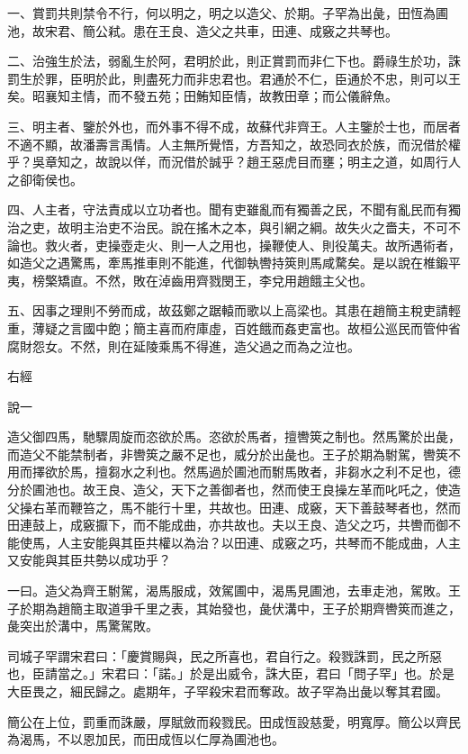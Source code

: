 
\begin{pinyinscope}
一、賞罰共則禁令不行，何以明之，明之以造父、於期。子罕為出彘，田恆為圃池，故宋君、簡公弒。患在王良、造父之共車，田連、成竅之共琴也。

二、治強生於法，弱亂生於阿，君明於此，則正賞罰而非仁下也。爵祿生於功，誅罰生於罪，臣明於此，則盡死力而非忠君也。君通於不仁，臣通於不忠，則可以王矣。昭襄知主情，而不發五苑；田鮪知臣情，故教田章；而公儀辭魚。

三、明主者、鑒於外也，而外事不得不成，故蘇代非齊王。人主鑒於士也，而居者不適不顯，故潘壽言禹情。人主無所覺悟，方吾知之，故恐同衣於族，而況借於權乎？吳章知之，故說以佯，而況借於誠乎？趙王惡虎目而壅；明主之道，如周行人之卻衛侯也。

四、人主者，守法責成以立功者也。聞有吏雖亂而有獨善之民，不聞有亂民而有獨治之吏，故明主治吏不治民。說在搖木之本，與引網之綱。故失火之嗇夫，不可不論也。救火者，吏操壺走火、則一人之用也，操鞭使人、則役萬夫。故所遇術者，如造父之遇驚馬，牽馬推車則不能進，代御執轡持筴則馬咸騖矣。是以說在椎鍛平夷，榜檠矯直。不然，敗在淖齒用齊戮閔王，李兌用趙餓主父也。

五、因事之理則不勞而成，故茲鄭之踞轅而歌以上高梁也。其患在趙簡主稅吏請輕重，薄疑之言國中飽；簡主喜而府庫虛，百姓餓而姦吏富也。故桓公巡民而管仲省腐財怨女。不然，則在延陵乘馬不得進，造父過之而為之泣也。

右經

說一

造父御四馬，馳驟周旋而恣欲於馬。恣欲於馬者，擅轡筴之制也。然馬驚於出彘，而造父不能禁制者，非轡筴之嚴不足也，威分於出彘也。王子於期為駙駕，轡筴不用而擇欲於馬，擅芻水之利也。然馬過於圃池而駙馬敗者，非芻水之利不足也，德分於圃池也。故王良、造父，天下之善御者也，然而使王良操左革而叱吒之，使造父操右革而鞭笞之，馬不能行十里，共故也。田連、成竅，天下善鼓琴者也，然而田連鼓上，成竅擫下，而不能成曲，亦共故也。夫以王良、造父之巧，共轡而御不能使馬，人主安能與其臣共權以為治？以田連、成竅之巧，共琴而不能成曲，人主又安能與其臣共勢以成功乎？

一曰。造父為齊王駙駕，渴馬服成，效駕圃中，渴馬見圃池，去車走池，駕敗。王子於期為趙簡主取道爭千里之表，其始發也，彘伏溝中，王子於期齊轡筴而進之，彘突出於溝中，馬驚駕敗。

司城子罕謂宋君曰：「慶賞賜與，民之所喜也，君自行之。殺戮誅罰，民之所惡也，臣請當之。」宋君曰：「諾。」於是出威令，誅大臣，君曰「問子罕」也。於是大臣畏之，細民歸之。處期年，子罕殺宋君而奪政。故子罕為出彘以奪其君國。

簡公在上位，罰重而誅嚴，厚賦斂而殺戮民。田成恆設慈愛，明寬厚。簡公以齊民為渴馬，不以恩加民，而田成恆以仁厚為圃池也。


\end{pinyinscope}
